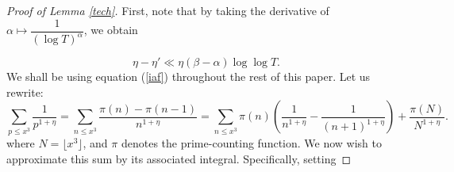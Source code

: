 \documentclass[10pt,a4paper]{amsart}
\renewcommand{\leq}{\leqslant}
\begin{document}
\begin{proof}[Proof of Lemma \ref{tech}]
First, note that by taking the derivative of $\alpha \mapsto \dfrac{1}{(\log T)^\alpha}$, we obtain

\begin{equation}
    \label{iaf}
    \eta - \eta' \ll \eta (\beta - \alpha) \log \log T.
\end{equation}
We shall be using equation (\ref{iaf}) throughout the rest of this paper.
Let us rewrite:
\begin{equation}
        \sum_{p \leq x^3} \frac{1}{p^{1 + \eta}}  = \sum_{n \leq x^3} \frac{\pi(n) - \pi(n-1)}{n^{1+\eta}} 
 = \sum_{n \leq x^3} \pi(n) (\frac{1}{n^{1 + \eta}} - \frac{1}{(n+1)^{1 + \eta}}) + \frac{\pi(N)}{N^{1+\eta}}.
\end{equation}
where $N = \lfloor x^3 \rfloor$, and $\pi$ denotes the prime-counting function. We now wish to approximate this sum by its associated integral. Specifically, setting


\end{proof}
\end{document}
